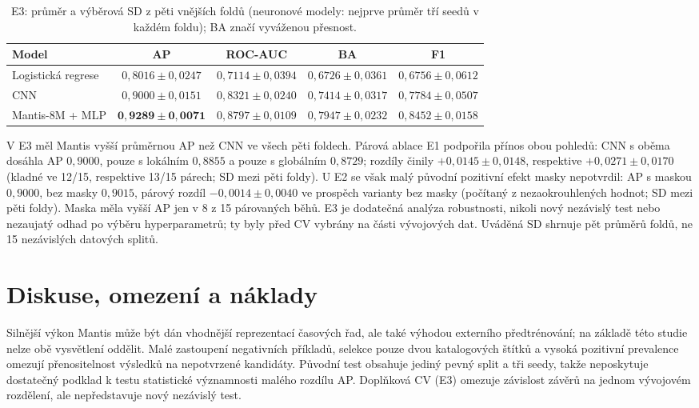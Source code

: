 \documentclass[11pt,a4paper]{article}
\begin{document}
\begin{table}[H]
\centering\footnotesize
\caption{E3: průměr a výběrová SD z pěti vnějších foldů (neuronové modely: nejprve průměr tří seedů v každém foldu); BA značí vyváženou přesnost.}
\label{tab:e3models}
{\setlength{\tabcolsep}{3pt}
\begin{tabular}{lcccc}
\toprule
Model & AP & ROC-AUC & BA & F1 \\
\midrule
Logistická regrese & $0{,}8016\pm0{,}0247$ & $0{,}7114\pm0{,}0394$ & $0{,}6726\pm0{,}0361$ & $0{,}6756\pm0{,}0612$ \\
CNN & $0{,}9000\pm0{,}0151$ & $0{,}8321\pm0{,}0240$ & $0{,}7414\pm0{,}0317$ & $0{,}7784\pm0{,}0507$ \\
Mantis-8M + MLP & $\mathbf{0{,}9289\pm0{,}0071}$ & $0{,}8797\pm0{,}0109$ & $0{,}7947\pm0{,}0232$ & $0{,}8452\pm0{,}0158$ \\
\bottomrule
\end{tabular}}
\end{table}

V E3 měl Mantis vyšší průměrnou AP než CNN ve všech pěti foldech. Párová ablace E1 podpořila přínos obou pohledů: CNN s oběma dosáhla AP $0{,}9000$, pouze s lokálním $0{,}8855$ a pouze s globálním $0{,}8729$; rozdíly činily $+0{,}0145\pm0{,}0148$, respektive $+0{,}0271\pm0{,}0170$ (kladné ve 12/15, respektive 13/15 párech; SD mezi pěti foldy). U E2 se však malý původní pozitivní efekt masky nepotvrdil: AP s maskou $0{,}9000$, bez masky $0{,}9015$, párový rozdíl $-0{,}0014\pm0{,}0040$ ve prospěch varianty bez masky (počítaný z nezaokrouhlených hodnot; SD mezi pěti foldy). Maska měla vyšší AP jen v 8 z 15 párovaných běhů. E3 je dodatečná analýza robustnosti, nikoli nový nezávislý test nebo nezaujatý odhad po výběru hyperparametrů; ty byly před CV vybrány na části vývojových dat. Uváděná SD shrnuje pět průměrů foldů, ne 15 nezávislých datových splitů.

\section{Diskuse, omezení a náklady}
Silnější výkon Mantis může být dán vhodnější reprezentací časových řad, ale také výhodou externího předtrénování; na základě této studie nelze obě vysvětlení oddělit. Malé zastoupení negativních příkladů, selekce pouze dvou katalogových štítků a vysoká pozitivní prevalence omezují přenositelnost výsledků na nepotvrzené kandidáty. Původní test obsahuje jediný pevný split a tři seedy, takže neposkytuje dostatečný podklad k testu statistické významnosti malého rozdílu AP. Doplňková CV (E3) omezuje závislost závěrů na jednom vývojovém rozdělení, ale nepředstavuje nový nezávislý test.
\end{document}
